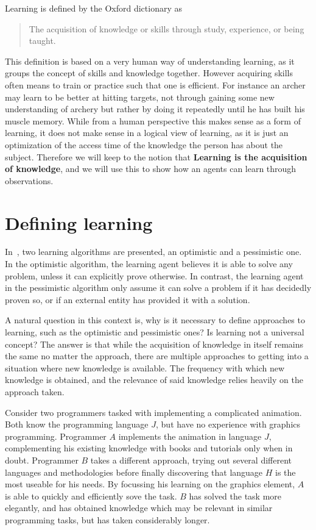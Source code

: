 \documentclass[../Master.tex]{subfiles}
\begin{document}
	
	Learning is defined by the Oxford dictionary as 
	\begin{quote}
		The acquisition of knowledge or skills through study, experience, or being taught.
	\end{quote}
	
	This definition is based on a very human way of understanding learning, as it groups the concept of skills and knowledge together.
	However acquiring skills often means to train or practice such that one is efficient. For instance an archer may learn to be better at hitting targets, 
	not through gaining some new understanding of archery but rather by doing it repeatedly until he has built his muscle memory.
	While from a human perspective this makes sense as a form of learning, 
	it does not make sense in a logical view of learning, as it is just an optimization of the access time of the knowledge the person has about the subject.
	Therefore we will keep to the notion that \textbf{Learning is the acquisition of knowledge}, and we will use this to show how an agents can learn through observations.
	
\section{Defining learning}
	
	In~\cite{Walsh2008}, two learning algorithms are presented, an optimistic and a pessimistic one.
    In the optimistic algorithm, the learning agent believes it is able to solve any problem, unless it can explicitly prove otherwise. In contrast, the learning agent in the pessimistic algorithm only assume it can solve a problem if it has decidedly proven so, or if an external entity has provided it with a solution. 

A natural question in this context is, why is it necessary to define approaches to learning, such as the optimistic and pessimistic ones? Is learning not a universal concept? The answer is that while the acquisition of knowledge in itself remains the same no matter the approach, there are multiple approaches to getting into a situation where new knowledge is available. The frequency with which new knowledge is obtained, and the relevance of said knowledge relies heavily on the approach taken.

\begin{example}
    Consider two programmers tasked with implementing a complicated animation. Both know the programming language $J$, but have no experience with graphics programming. Programmer $A$ implements the animation in language $J$, complementing his existing knowledge with books and tutorials only when in doubt. Programmer $B$ takes a different approach, trying out several different languages and methodologies before finally discovering that language $H$ is the most useable for his needs. By focussing his learning on the graphics element, $A$ is able to quickly and efficiently sove the task. $B$ has solved the task more elegantly, and has obtained knowledge which may be relevant in similar programming tasks, but has taken considerably longer.
\end{example}
\end{document}
